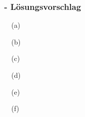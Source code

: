 \begin{frame}[t]
  \frametitle{\stitle\ - L\"osungsvorschlag}
\begin{center}
\begin{minipage}{0.49\textwidth}
\begin{itemize}
\item[(a)]{ \rightarrow {}}\\
\item[(b)]{ \rightarrow {}}\\
\item[(c)]{ \rightarrow {}}\\
\end{itemize}
\end{minipage}
\begin{minipage}{0.49\textwidth}
\begin{itemize}
\item[(d)]{ \rightarrow {}}\\
\item[(e)]{ \rightarrow {}}\\
\item[(f)]{ \rightarrow {}}\\
\end{itemize}
\end{minipage}
\end{center}

\end{frame}
